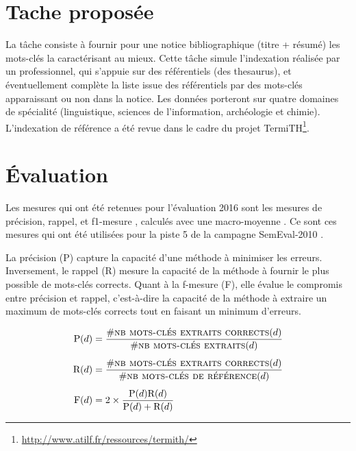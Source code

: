 \documentclass[10pt,twoside]{article}
\begin{document}
    \section{Tache proposée}
    
    La tâche consiste à fournir pour une notice bibliographique (titre + résumé) les mots-clés la caractérisant au mieux. Cette tâche simule l’indexation réalisée par un professionnel, qui s’appuie sur des référentiels (des thesaurus), et éventuellement complète la liste issue des référentiels par des mots-clés apparaissant ou non dans la notice. Les données porteront sur quatre domaines de spécialité (linguistique, sciences de l’information, archéologie et chimie). L’indexation de référence a été revue dans le cadre du projet TermiTH\footnote{\url{http://www.atilf.fr/ressources/termith/}}.
    
    \section{\'Evaluation}
    Les mesures qui ont été retenues pour l'évaluation 2016 sont les mesures de
précision, rappel, et f1-mesure \cite{Manning:1999}, calculés avec une macro-moyenne \cite{}. Ce sont ces mesures qui ont été utilisées pour la piste 5 de la campagne
SemEval-2010 \cite{kim2010semeval}.

La précision (P) capture la capacité d'une méthode à minimiser les erreurs. Inversement, le rappel (R) mesure la capacité de
    la méthode à fournir le plus possible de mots-clés corrects. Quant à la f-mesure (F), elle évalue le compromis
    entre précision et rappel, c'est-à-dire la capacité de la méthode à extraire
    un maximum de mots-clés corrects tout en faisant un minimum d'erreurs.
  \begin{center}  
    \begin{align}
      \textnormal{P}(d) &= \frac{\#\textsc{nb mots-clés extraits corrects}(d)}
      {\#\textsc{nb mots-clés extraits} (d)} \\[1 ex]
      \textnormal{R}(d) &= \frac{\#\textsc{nb mots-clés extraits corrects} (d)}
      {\#\textsc{nb mots-clés de référence} (d)} \\[1 ex]
      \textnormal{F}(d) &= 2 \times \frac{\textnormal{P}(d) \textnormal{R}(d)}
      {\textnormal{P}(d) + \textnormal{R}(d)}
    \end{align}
  \end{center}  
      
\end{document}
